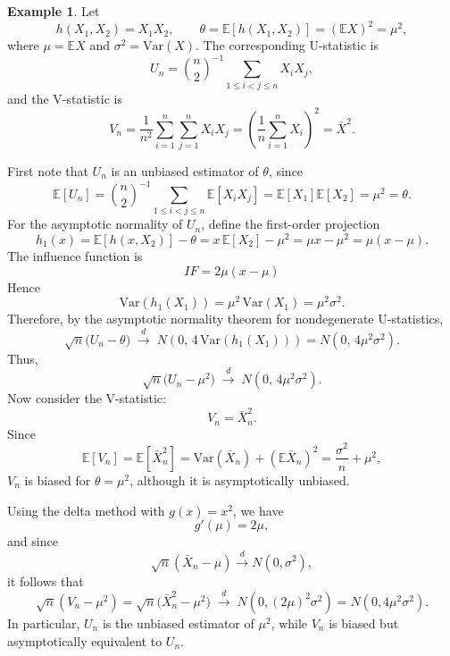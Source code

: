 \documentclass[11pt]{article}
\theoremstyle{definition}
\newtheorem{exmp}{Example}[section]
\begin{document}
\begin{exmp}
Let
\[
h(X_1,X_2)=X_1X_2,
\qquad
\theta = \mathbb{E}[h(X_1,X_2)] = (\mathbb{E}X)^2 = \mu^2,
\]
where \(\mu=\mathbb{E}X\) and \(\sigma^2=\mathrm{Var}(X)\). The corresponding U-statistic is
\[
U_n=\binom{n}{2}^{-1}\sum_{1\le i<j\le n}X_iX_j,
\]
and the V-statistic is
\[
V_n=\frac{1}{n^2}\sum_{i=1}^n\sum_{j=1}^n X_iX_j
=\left(\frac1n\sum_{i=1}^n X_i\right)^2=\bar X^2.
\]

First note that \(U_n\) is an unbiased estimator of \(\theta\), since
\[
\mathbb{E}[U_n]
=
\binom{n}{2}^{-1}\sum_{1\le i<j\le n}\mathbb{E}[X_iX_j]
=
\mathbb{E}[X_1]\mathbb{E}[X_2]
=
\mu^2
=
\theta.
\]
For the asymptotic normality of \(U_n\), define the first-order projection
\[
h_1(x)=\mathbb{E}[h(x,X_2)]-\theta
= x\,\mathbb{E}[X_2]-\mu^2
= \mu x-\mu^2
= \mu(x-\mu).
\]
The influence function is
\[
IF = 2\mu(x-\mu)
\]
Hence
\[
\mathrm{Var}(h_1(X_1))
=
\mu^2\,\mathrm{Var}(X_1)
=
\mu^2\sigma^2.
\]
Therefore, by the asymptotic normality theorem for nondegenerate U-statistics,
\[
\sqrt{n}\bigl(U_n-\theta\bigr)
\;\xrightarrow{d}\;
N\!\left(0,\,4\,\mathrm{Var}(h_1(X_1))\right)
=
N\!\left(0,\,4\mu^2\sigma^2\right).
\]
Thus,
\[
\sqrt{n}\bigl(U_n-\mu^2\bigr)
\;\xrightarrow{d}\;
N\!\left(0,\,4\mu^2\sigma^2\right).
\]
Now consider the V-statistic:
\[
V_n=\bar X_n^2.
\]
Since
\[
\mathbb{E}[V_n]
=
\mathbb{E}[\bar X_n^2]
=
\mathrm{Var}(\bar X_n)+(\mathbb{E}\bar X_n)^2
=
\frac{\sigma^2}{n}+\mu^2,
\]
\(V_n\) is biased for \(\theta=\mu^2\), although it is asymptotically unbiased.

Using the delta method with \(g(x)=x^2\), we have
\[
g'(\mu)=2\mu,
\]
and since
\[
\sqrt{n}(\bar X_n-\mu)\xrightarrow{d}N(0,\sigma^2),
\]
it follows that
\[
\sqrt{n}(V_n-\mu^2)
=
\sqrt{n}\bigl(\bar X_n^2-\mu^2\bigr)
\;\xrightarrow{d}\;
N\!\left(0,(2\mu)^2\sigma^2\right)
=
N\!\left(0,4\mu^2\sigma^2\right).
\]
In particular, \(U_n\) is the unbiased estimator of \(\mu^2\), while \(V_n\) is biased but asymptotically equivalent to \(U_n\).
\end{exmp}
\end{document}
